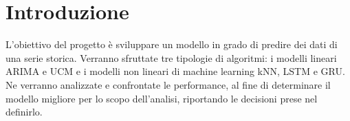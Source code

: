 
\chapter{Introduzione}

L’obiettivo del progetto è sviluppare un modello in grado di predire dei dati di una serie storica. Verranno sfruttate tre tipologie di algoritmi: i modelli lineari ARIMA e UCM e i modelli non lineari di machine learning kNN, LSTM e GRU. Ne verranno analizzate e confrontate le performance, al fine di determinare il modello migliore per lo scopo dell’analisi, riportando le decisioni prese nel definirlo.



